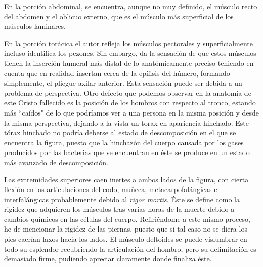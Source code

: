 En la porción abdominal, se encuentra, aunque no muy definido, el músculo recto del abdomen y el oblicuo externo, que es el músculo más superficial de los músculos laminares.

En la porción torácica el autor refleja los músculos pectorales y superficialmente incluso identifica los pezones. Sin embargo, da la sensación de que estos músculos tienen la inserción humeral más distal de lo anatómicamente preciso teniendo en cuenta que en realidad insertan cerca de la epífisis del húmero, formando simplemente, el pliegue axilar anterior. Esta sensación puede ser debida a un problema de perspectiva. Otro defecto que podemos observar en la anatomía de este Cristo fallecido es la posición de los hombros con respecto al tronco, estando más ``caídos" de lo que podríamos ver a una persona en la misma posición y desde la misma perspectiva, dejando a la vista un torax en apariencia hinchado. Este tórax hinchado no podría deberse al estado de descomposición en el que se encuentra la figura, puesto que la hinchazón del cuerpo causada por los gases producidos por las bacterias que se encuentran en éste se produce en un estado más avanzado de descomposición.

Las extremidades superiores caen inertes a ambos lados de la figura, con cierta flexión en las articulaciones del codo, muñeca, metacarpofalángicas e interfalángicas probablemente debido al \textit{rigor mortis}. Éste se define como la rigidez que adquieren los músculos tras varias horas de la muerte debido a cambios químicos en las células del cuerpo. Refiriéndome a este mismo proceso, he de mencionar la rigidez de las piernas, puesto que si tal caso no se diera los pies caerían laxos hacia los lados. El músculo deltoides se puede vislumbrar en todo su esplendor recubriendo la articulación del hombro, pero su delimitación es demasiado firme, pudiendo apreciar claramente donde finaliza éste.
